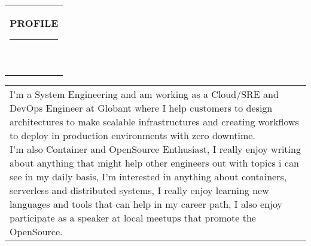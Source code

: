 \documentclass[10pt,A4]{article}
\newcommand{\mpwidth}{\linewidth-\fboxsep-\fboxsep}
\newcommand{\cvtext}[1] {
	\begin{tabular*}{1\mpwidth}{p{0.98\mpwidth}}
		\parbox{1\mpwidth}{#1}
	\end{tabular*}
}
\newcommand{\cvsection}[1] {
	\vspace{14pt}
	\cvtext{
		\textbf{\LARGE{\textcolor{darkcol}{\uppercase{#1}}}}\\[-4pt]
		\textcolor{maincol}{ \rule{0.1\textwidth}{2pt} } \\
	}
}
\begin{document}
\begin{paracol}{2}
\begin{rightcolumn}
\vfill\null
\cvsection{PROFILE}

\cvtext{
I'm a System Engineering and am working as a Cloud/SRE and DevOps Engineer at Globant where I help
customers to design architectures to make scalable infrastructures and creating workflows to deploy in
production environments with zero downtime. \\

I'm also Container and OpenSource Enthusiast, I really enjoy writing about anything that might help other engineers out with topics i can see in my daily basis, I'm interested in anything about containers, serverless  and distributed systems, I really enjoy learning new languages and tools that can help in my career path, I also enjoy participate as a speaker at local meetups that promote the OpenSource. \\



}



\end{rightcolumn}
\end{paracol}
\end{document}
